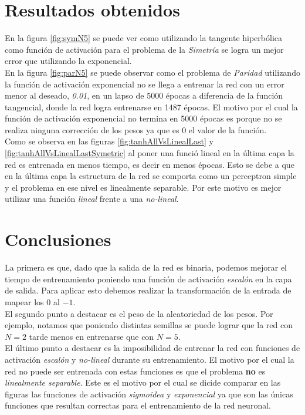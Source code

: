 \documentclass{sig-alternate}
\begin{document}
\section*{Resultados obtenidos}

	En la figura \ref{fig:symN5} se puede ver como utilizando la tangente hiperb\'olica como funci\'on de activaci\'on para el problema de la \textit{Simetr\'ia} se logra un mejor error que utilizando la exponencial.\\
	En la figura \ref{fig:parN5} se puede observar como el problema de \textit{Paridad} utilizando la funci\'on de activaci\'on exponencial no se llega a entrenar la red con un error menor al deseado, \textit{0.01}, en un lapso de 5000 \'epocas a diferencia de la funci\'on tangencial, donde la red logra entrenarse en 1487 \'epocas. El motivo por el cual la funci\'on de activaci\'on exponencial no termina en 5000 \'epocas es porque no se realiza ninguna correcci\'on de los pesos ya que es 0 el valor de la funci\'on. \\
	Como se observa en las figuras \ref{fig:tanhAllVsLinealLast} y \ref{fig:tanhAllVsLinealLastSymetric} al poner una funci\'o lineal en la \'ultima capa la red es entrenada en menos tiempo, es decir en menos \'epocas. Esto se debe a que en la \'ultima capa la estructura de la red se comporta como un perceptron simple y el problema en ese nivel es linealmente separable. Por este motivo es mejor utilizar una funci\'on \textit{lineal} frente a una \textit{no-lineal}.\\

\section*{Conclusiones}

	La primera es que, dado que la salida de la red es binaria, podemos mejorar el tiempo de entrenamiento poniendo una funci\'on de activaci\'on \textit{escal\'on} en la capa de salida. Para aplicar esto debemos realizar la transformaci\'on de la entrada de mapear los $0$ al $-1$.\\
	El segundo punto a destacar es el peso de la aleatoriedad de los pesos. Por ejemplo, notamos que poniendo distintas semillas se puede lograr que la red con $N=2$ tarde menos en entrenarse que con $N=5$.\\
	El \'ultimo punto a destacar es la imposibilidad de entrenar la red con funciones de activaci\'on \textit{escal\'on} y \textit{no-lineal} durante su entrenamiento. El motivo por el cual la red no puede ser entrenada con estas funciones es que el problema \textbf{no} es \textit{linealmente separable}.
	Este es el motivo por el cual se dicide comparar en las figuras las funciones de activaci\'on \textit{sigmoidea} y \textit{exponencial} ya que son las \'unicas funciones que resultan correctas para el entrenamiento de la red neuronal.
\end{document}
